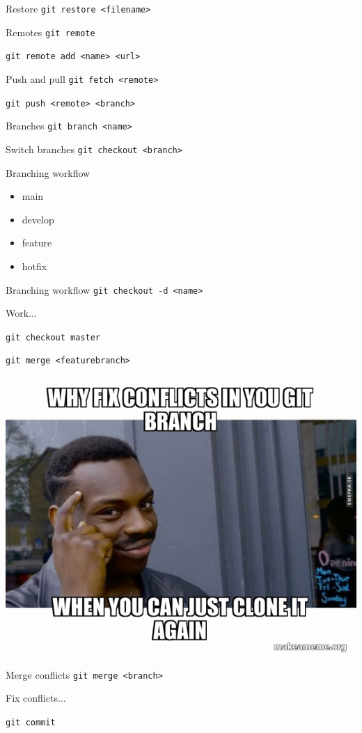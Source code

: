 \documentclass[17pt]{beamer}
\begin{document}
\begin{frame}{Restore}
  \texttt{git restore <filename>}
\end{frame}

\begin{frame}{Remotes}
  \texttt{git remote}

  \texttt{git remote add <name> <url>}
\end{frame}

\begin{frame}{Push and pull}
  \texttt{git fetch <remote>}

  \texttt{git push <remote> <branch>}
\end{frame}

\begin{frame}{Branches}
  \texttt{git branch <name>}
\end{frame}

\begin{frame}{Switch branches}
  \texttt{git checkout <branch>}
\end{frame}

\begin{frame}{Branching workflow}
  \begin{itemize}
    \item main
    \item develop
    \item feature
    \item hotfix
  \end{itemize}
\end{frame}

\begin{frame}{Branching workflow}
  \texttt{git checkout -d <name>}

  Work...
  
  \texttt{git checkout master}

  \texttt{git merge <featurebranch>}
\end{frame}

\begin{frame}
  \centering
  \includegraphics[height=\textheight]{why-fix-conflicts}
\end{frame}

\begin{frame}{Merge conflicts}
  \texttt{git merge <branch>}

  Fix conflicts...

  \texttt{git commit}
\end{frame}
\end{document}
